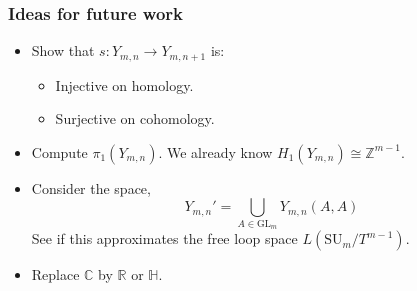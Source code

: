 \documentclass{beamer} %
\newcommand{\Z}{\mathbb{Z}}
\newcommand{\R}{\mathbb{R}}
\newcommand{\C}{\mathbb{C}}
\newcommand{\SUT}[1]{\SU_{#1}/T^{#1-1}}
\newcommand{\GL}{\mathrm{GL}}
\newcommand{\SU}{\mathrm{SU}}
\begin{document}
\begin{frame}
  \frametitle{Ideas for future work}
  \begin{itemize}
  \item Show that $s : Y_{m,n} \to Y_{m,n+1}$ is:\pause
    \begin{itemize}
    \item Injective on homology.
    \item Surjective on cohomology.
    \end{itemize} \pause
  \item Compute $\pi_1(Y_{m,n})$. We already know $H_1(Y_{m,n}) \cong
    \Z^{m-1}$. \pause
  \item Consider the space,
    \[ Y_{m,n}' = \bigcup_{A\in \GL_m} Y_{m,n}(A,A) \]
    See if this approximates the free loop space $L(\SUT{m})$. \pause
  \item Replace $\C$ by $\R$ or $\mathbb{H}$.
  \end{itemize}
\end{frame}
\end{document}
